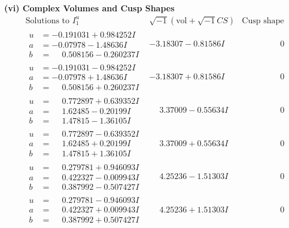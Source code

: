 \documentclass[1p]{elsarticle_modified}
\theoremstyle{definition}
\newcommand{\I}{\sqrt{-1}}
\begin{document}
\newpage\flushleft \textbf{(vi) Complex Volumes and Cusp Shapes}
$$\begin{array}{c|c|c}  
\text{Solutions to }I^u_{1}& \I (\text{vol} + \sqrt{-1}CS) & \text{Cusp shape}\\
 \hline 
\begin{aligned}
u &= -0.191031 + 0.984252 I \\
a &= -0.07978 - 1.48636 I \\
b &= \phantom{-}0.508156 - 0.260237 I\end{aligned}
 & -3.18307 - 0.81586 I & \phantom{-0.000000 } 0 \\ \hline\begin{aligned}
u &= -0.191031 - 0.984252 I \\
a &= -0.07978 + 1.48636 I \\
b &= \phantom{-}0.508156 + 0.260237 I\end{aligned}
 & -3.18307 + 0.81586 I & \phantom{-0.000000 } 0 \\ \hline\begin{aligned}
u &= \phantom{-}0.772897 + 0.639352 I \\
a &= \phantom{-}1.62485 - 0.20199 I \\
b &= \phantom{-}1.47815 - 1.36105 I\end{aligned}
 & \phantom{-}3.37009 - 0.55634 I & \phantom{-0.000000 } 0 \\ \hline\begin{aligned}
u &= \phantom{-}0.772897 - 0.639352 I \\
a &= \phantom{-}1.62485 + 0.20199 I \\
b &= \phantom{-}1.47815 + 1.36105 I\end{aligned}
 & \phantom{-}3.37009 + 0.55634 I & \phantom{-0.000000 } 0 \\ \hline\begin{aligned}
u &= \phantom{-}0.279781 + 0.946093 I \\
a &= \phantom{-}0.422327 - 0.009943 I \\
b &= \phantom{-}0.387992 - 0.507427 I\end{aligned}
 & \phantom{-}4.25236 - 1.51303 I & \phantom{-0.000000 } 0 \\ \hline\begin{aligned}
u &= \phantom{-}0.279781 - 0.946093 I \\
a &= \phantom{-}0.422327 + 0.009943 I \\
b &= \phantom{-}0.387992 + 0.507427 I\end{aligned}
 & \phantom{-}4.25236 + 1.51303 I & \phantom{-0.000000 } 0 \\ \hline\begin{aligned}

\end{aligned}
\end{array}$$
\end{document}
